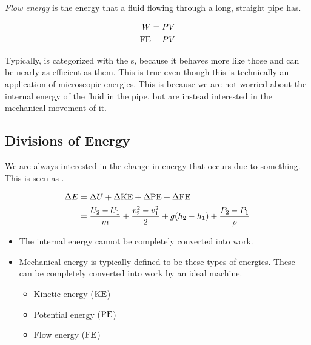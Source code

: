 \begin{definition}\label{def:Flow_Energy}
  \emph{Flow energy} is the energy that a fluid flowing through a long, straight pipe has.

  \begin{equation}\label{eq:Flow_Energy}
    \begin{aligned}
      W &= P V \\
      \textrm{FE} &= P V \\
    \end{aligned}
  \end{equation}

  \begin{remark}
    Typically,  is categorized with the s, because it behaves more like those and can be nearly as efficient as them.
    This is true even though this is technically an application of microscopic energies.
    This is because we are not worried about the internal energy of the fluid in the pipe, but are instead interested in the mechanical movement of it.
  \end{remark}
\end{definition}

\subsection{Divisions of Energy}\label{subsec:Divisions_of_Energy}
We are always interested in the change in energy that occurs due to something.
This is seen as .

\begin{equation}\label{eq:Change_Total_Energy}
  \begin{aligned}
    \Delta E &= \Delta U + \Delta \textrm{KE} + \Delta \textrm{PE} + \Delta \textrm{FE} \\
    &= \frac{U_{2} - U_{1}}{m} + \frac{v_{2}^{2} - v_{1}^{2}}{2} + g (h_{2} - h_{1}) + \frac{P_{2} - P_{1}}{\rho} \\
  \end{aligned}
\end{equation}
\begin{itemize}[noitemsep]
\item The internal energy cannot be completely converted into work.
\item Mechanical energy is typically defined to be these types of energies.
  These can be completely converted into work by an ideal machine.
  \begin{itemize}[noitemsep]
  \item Kinetic energy ($\textrm{KE}$)
  \item Potential energy ($\textrm{PE}$)
  \item Flow energy ($\textrm{FE}$)
  \end{itemize}
\end{itemize}

